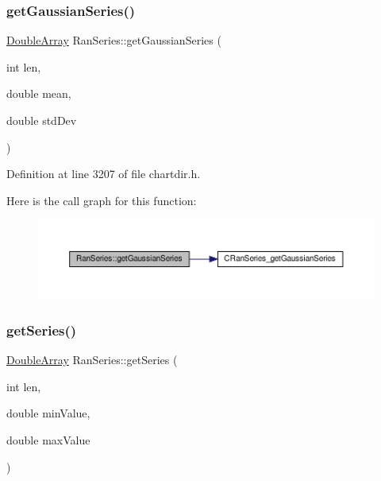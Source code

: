 \subsubsection{\texorpdfstring{get\+Gaussian\+Series()}{getGaussianSeries()}}
{\footnotesize\ttfamily \hyperlink{class_double_array}{Double\+Array} Ran\+Series\+::get\+Gaussian\+Series (\begin{DoxyParamCaption}\item[{int}]{len,  }\item[{double}]{mean,  }\item[{double}]{std\+Dev }\end{DoxyParamCaption})\hspace{0.3cm}{\ttfamily [inline]}}



Definition at line 3207 of file chartdir.\+h.

Here is the call graph for this function\+:
\nopagebreak
\begin{figure}[H]
\begin{center}
\leavevmode
\includegraphics[width=350pt]{class_ran_series_ac538aef12148303005ef6af6a882af88_cgraph}
\end{center}
\end{figure}
\mbox{\label{class_ran_series_a2bfeae67f518cc2273f8aa3d8e6c8408}} 
\subsubsection{\texorpdfstring{get\+Series()}{getSeries()}\hspace{0.1cm}{\footnotesize\ttfamily [1/2]}}
{\footnotesize\ttfamily \hyperlink{class_double_array}{Double\+Array} Ran\+Series\+::get\+Series (\begin{DoxyParamCaption}\item[{int}]{len,  }\item[{double}]{min\+Value,  }\item[{double}]{max\+Value }\end{DoxyParamCaption})\hspace{0.3cm}{\ttfamily [inline]}}



